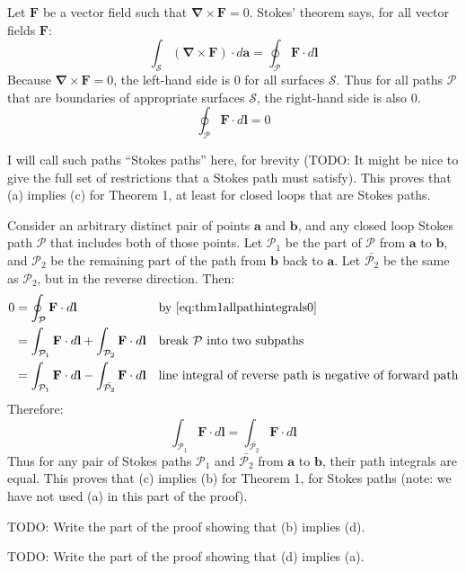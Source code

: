 \documentclass[a4paper]{article}
\theoremstyle{plain}
\theoremstyle{definition}
\newcommand{\vect}[1]{\textbf{#1}}
\newcommand{\del}{\bm{\nabla}}
\begin{document}
Let $\vect{F}$ be a vector field such that $\del \times \vect{F} = 0$.
Stokes' theorem says, for all vector fields $\vect{F}$:
\begin{equation}
\int_{\mathcal{S}} (\del \times \vect{F}) \cdot d\vect{a} = \oint_{\mathcal{P}} \vect{F} \cdot d\vect{l} \nonumber
\end{equation}
Because $\del \times \vect{F} = 0$, the left-hand side is 0 for all
surfaces $\mathcal{S}$.  Thus for all paths $\mathcal{P}$ that are
boundaries of appropriate surfaces $\mathcal{S}$, the right-hand side
is also 0.
\begin{equation}
\oint_{\mathcal{P}} \vect{F} \cdot d\vect{l} = 0 \label{eq:thm1allpathintegrals0}
\end{equation}

I will call such paths ``Stokes paths'' here, for brevity (TODO: It
might be nice to give the full set of restrictions that a Stokes path
must satisfy).
This proves that (a) implies (c) for Theorem 1, at least for closed
loops that are Stokes paths.

Consider an arbitrary distinct pair of points $\vect{a}$ and
$\vect{b}$, and any closed loop Stokes path $\mathcal{P}$ that
includes both of those points.  Let $\mathcal{P}_1$ be the part of
$\mathcal{P}$ from $\vect{a}$ to $\vect{b}$, and $\mathcal{P}_2$ be
the remaining part of the path from $\vect{b}$ back to $\vect{a}$.
Let $\bar{\mathcal{P}_2}$ be the same as $\mathcal{P}_2$, but in the
reverse direction.  Then:
\begin{align}
  0
      & = \oint_{\mathcal{P}} \vect{F} \cdot d\vect{l} & & \text{by~\eqref{eq:thm1allpathintegrals0}} \nonumber \\
      & = \int_{\mathcal{P}_1} \vect{F} \cdot d\vect{l} + \int_{\mathcal{P}_2} \vect{F} \cdot d\vect{l} & & \text{break $\mathcal{P}$ into two subpaths} \nonumber \\
      & = \int_{\mathcal{P}_1} \vect{F} \cdot d\vect{l} - \int_{\bar{\mathcal{P}_2}} \vect{F} \cdot d\vect{l} & & \text{line integral of reverse path is negative of forward path} \nonumber
\end{align}
Therefore:
\begin{equation}
\int_{\mathcal{P}_1} \vect{F} \cdot d\vect{l} = \int_{\bar{\mathcal{P}_2}} \vect{F} \cdot d\vect{l}
\end{equation}
Thus for any pair of Stokes paths $\mathcal{P}_1$ and
$\bar{\mathcal{P}_2}$ from $\vect{a}$ to $\vect{b}$, their path
integrals are equal.
This proves that (c) implies (b) for Theorem 1, for Stokes paths
(note: we have not used (a) in this part of the proof).

TODO: Write the part of the proof showing that (b) implies (d).

TODO: Write the part of the proof showing that (d) implies (a).
\end{document}
